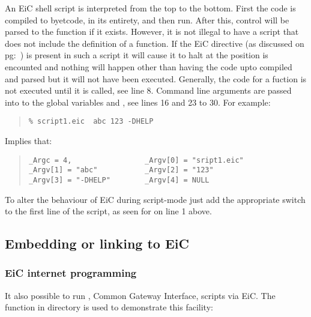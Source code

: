 An EiC shell script is interpreted from the top to the bottom. First
the code is compiled to byetcode, in its entirety, and then run. After
this, control will be parsed to the  function if it
exists. However, it is not illegal to have a script that does not
include the definition of a  function. If the EiC directive
 (as discussed on pg:~\pageref{item:exit}) is present in such
a script it will cause it to halt at the position
 is encounted and nothing will happen other than having the code
upto  compiled and parsed but it will not have been
executed.  Generally, the code for a fuction is not executed until it
is called, see line 8. Command line arguments are passed into to the
global variables  and
, see lines 16 and 23 to 30. For example:
\begin{quote} 
\begin{verbatim}
% script1.eic  abc 123 -DHELP
\end{verbatim}
\end{quote}
Implies that:
\begin{quote} 
\begin{verbatim}
_Argc = 4,                 _Argv[0] = "sript1.eic"    
_Argv[1] = "abc"           _Argv[2] = "123"
_Argv[3] = "-DHELP"        _Argv[4] = NULL
\end{verbatim}
\end{quote}



To alter the behaviour of EiC during script-mode just add the
appropriate switch to the first line of the script, as seen for 
on line 1 above. 


\subsection{Embedding or linking to EiC}
\label{sec:embedding}



\subsubsection{EiC internet programming}
\label{sec:internet}

It also possible to run , Common Gateway Interface, scripts via
EiC. The function  in directory
 is used to demonstrate this
facility:


